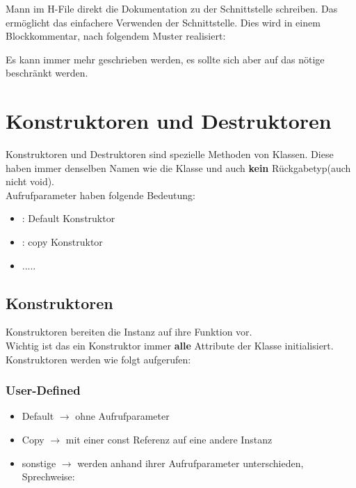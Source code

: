Mann im H-File direkt die Dokumentation zu der Schnittstelle schreiben. 
Das ermöglicht das einfachere Verwenden der Schnittstelle.
Dies wird in einem Blockkommentar, nach folgendem Muster realisiert:



Es kann immer mehr geschrieben werden, es sollte sich aber auf das nötige beschränkt werden.

\section{Konstruktoren und Destruktoren}

Konstruktoren und Destruktoren sind spezielle Methoden von Klassen. 
Diese haben immer denselben Namen wie die Klasse und auch \textbf{kein} Rückgabetyp(auch nicht void).\\
Aufrufparameter haben folgende Bedeutung:

\begin{itemize}[itemsep=1pt, parsep=0pt]
    \item \textbf{} : Default Konstruktor
    \item \textbf{} : copy Konstruktor
    \item .....
\end{itemize}

\subsection{Konstruktoren}

Konstruktoren bereiten die Instanz auf ihre Funktion vor. \\

Wichtig ist das ein Konstruktor immer \textbf{alle} Attribute der Klasse initialisiert.
Konstruktoren werden wie folgt aufgerufen:\\

\subsubsection{User-Defined}

\begin{itemize}[itemsep=1pt, parsep=0pt]
    \item Default $\rightarrow$ ohne Aufrufparameter
    \item Copy $\rightarrow$ mit einer const Referenz auf eine andere Instanz
    \item sonstige $\rightarrow$ werden anhand ihrer Aufrufparameter unterschieden, Sprechweise:
\end{itemize}

